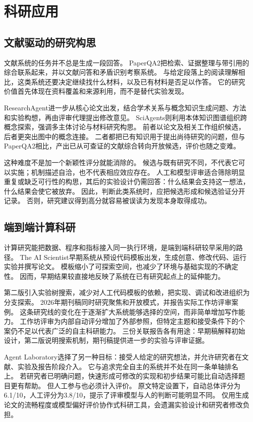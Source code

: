 \section{科研应用}
\subsection{文献驱动的研究构思}
文献系统的任务并不总是生成一段回答。
PaperQA2把检索、证据整理与带引用的综合联系起来，并以文献问答和矛盾识别考察系统\cite{paperqa}。
与给定段落上的阅读理解相比，这类系统还要决定继续找什么材料，以及已有材料是否足以作答。
它的研究价值首先体现在资料覆盖和来源利用，而不是替代实验发现。

ResearchAgent进一步从核心论文出发，结合学术关系与概念知识生成问题、方法和实验构想，再由评审代理提出修改意见\cite{researchagent}。
SciAgents则利用本体知识图谱组织跨概念探索，强调多主体讨论与材料研究构思\cite{sciagents}。
前者以论文及相关工作组织候选，后者更突出图中的概念连接。
二者都把已有知识用于提出尚待研究的问题，但与PaperQA2相比，产出已从可查证的文献综合转向开放候选，评价也随之变难。

这种难度不是加一个新颖性评分就能消除的。
候选与既有研究不同，不代表它可以实施；机制描述自洽，也不代表相应效应存在。
人工和模型评审适合筛除明显重复或缺乏可行性的构思，其后的实验设计仍需回答：什么结果会支持这一想法，什么结果会使它被放弃。
因此，判断此类系统时，应把候选形成和候选验证分开记录。
否则，研究建议得到高分就容易被误读为发现本身取得成功。

\subsection{端到端计算科研}
计算研究能把数据、程序和指标接入同一执行环境，是端到端科研较早采用的路径。
The AI Scientist早期系统从预设代码模板出发，生成创意、修改代码、运行实验并撰写论文\cite{scientist}。
模板缩小了可探索空间，也减少了环境与基础实现的不确定性。
因而，早期结果较直接地反映了系统在已有研究起点上的延伸能力。

第二版引入实验树搜索，减少对人工代码模板的依赖，把实现、调试和改进组织为分支探索\cite{scientistv2}。
2026年期刊稿同时研究聚焦和开放模式，并报告实际工作坊评审案例\cite{scientistjournal}。
这条研究线的变化在于逐渐扩大系统能够选择的空间，而非简单增加写作能力。
工作坊评审为内部自动评分增加了外部参照，但特定主题和接受条件下的个案仍不足以代表广泛的自主科研能力。
三份关联报告各有用途：早期稿解释初始设计，第二版说明搜索机制，期刊稿提供进一步的实验与评审证据。

Agent Laboratory选择了另一种目标：接受人给定的研究想法，并允许研究者在文献、实验及报告阶段介入\cite{lab}。
它与追求完全自主的系统并不处在同一条单轴排名上。
若研究者已明确问题，快速形成可修改的实现和初步结果可能比自动选择题目更有帮助。
但人工参与也必须计入评价。
原文特定设置下，自动总体评分为6.1/10，人工评分为3.8/10，提示了评审模型与人的判断可能明显不同。
仅用生成论文的流畅程度或模型偏好评价协作式科研工具，会遗漏实验设计和研究者修改负担。

